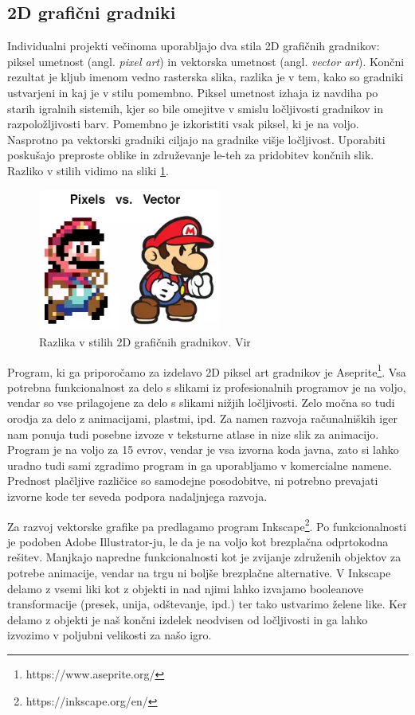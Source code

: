 \documentclass[12pt,a4paper,twoside]{book}
\begin{document}
\subsection{2D grafični gradniki}
Individualni projekti večinoma uporabljajo dva stila 2D grafičnih gradnikov: piksel umetnost (angl. \textit{pixel art}) in vektorska umetnost (angl. \textit{vector art}). Končni rezultat je kljub imenom vedno rasterska slika, razlika je v tem, kako so gradniki ustvarjeni in kaj je v stilu pomembno. Piksel umetnost izhaja iz navdiha po starih igralnih sistemih, kjer so bile omejitve v smislu ločljivosti gradnikov in razpoložljivosti barv. Pomembno je izkoristiti vsak piksel, ki je na voljo. Nasprotno pa vektorski gradniki ciljajo na gradnike višje ločljivost. Uporabiti poskušajo preproste oblike in združevanje le-teh za pridobitev končnih slik. Razliko v stilih vidimo na sliki \ref{slika:pixelVsVector}.

\begin{figure}[h]
	\centering
	\includegraphics[width=6cm]{pixelVsVector}
	\caption{Razlika v stilih 2D grafičnih gradnikov. Vir \cite{pixelVsVector}}
	\label{slika:pixelVsVector}
\end{figure}

Program, ki ga priporočamo za izdelavo 2D piksel art gradnikov je Aseprite\footnote{https://www.aseprite.org/}. Vsa potrebna funkcionalnost za delo s slikami iz profesionalnih programov je na voljo, vendar so vse prilagojene za delo s slikami nižjih ločljivosti. Zelo močna so tudi orodja za delo z animacijami, plastmi, ipd. Za namen razvoja računalniških iger nam ponuja tudi posebne izvoze v teksturne atlase in nize slik za animacijo. Program je na voljo za 15 evrov, vendar je vsa izvorna koda javna, zato si lahko uradno tudi sami zgradimo program in ga uporabljamo v komercialne namene. Prednost plačljive različice so samodejne posodobitve, ni potrebno prevajati izvorne kode ter seveda podpora nadaljnjega razvoja.

Za razvoj vektorske grafike pa predlagamo program Inkscape\footnote{https://inkscape.org/en/}. Po funkcionalnosti je podoben Adobe Illustrator-ju, le da je na voljo kot brezplačna odprtokodna rešitev. Manjkajo napredne funkcionalnosti kot je zvijanje združenih objektov za potrebe animacije, vendar na trgu ni boljše brezplačne alternative. V Inkscape delamo z vsemi liki kot z objekti in nad njimi lahko izvajamo booleanove transformacije (presek, unija, odštevanje, ipd.) ter tako ustvarimo želene like. Ker delamo z objekti je naš končni izdelek neodvisen od ločljivosti in ga lahko izvozimo v poljubni velikosti za našo igro. 
\end{document}
